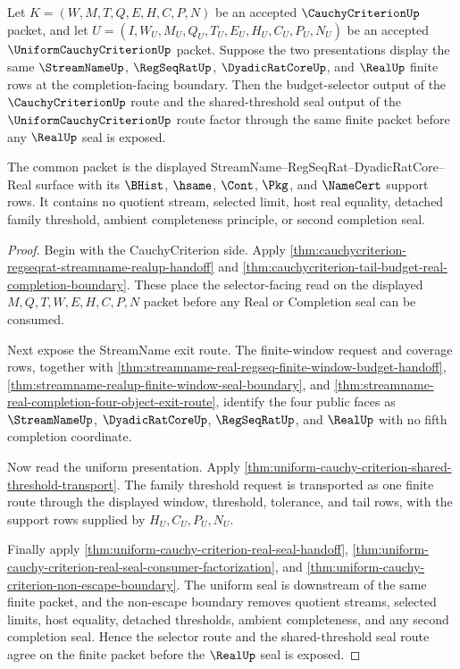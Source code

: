 \begin{theorem}
\label{thm:cauchycriterion-uniform-selector-seal-compatibility}
Let $K=(W,M,T,Q,E,H,C,P,N)$ be an accepted $\CauchyCriterionUp$ packet, and
let $U=(I,W_U,M_U,Q_U,T_U,E_U,H_U,C_U,P_U,N_U)$ be an accepted
$\UniformCauchyCriterionUp$ packet. Suppose the two presentations display the
same $\StreamNameUp$, $\RegSeqRatUp$, $\DyadicRatCoreUp$, and $\RealUp$ finite
rows at the completion-facing boundary. Then the budget-selector output of the
$\CauchyCriterionUp$ route and the shared-threshold seal output of the
$\UniformCauchyCriterionUp$ route factor through the same finite packet before
any $\RealUp$ seal is exposed.

The common packet is the displayed StreamName--RegSeqRat--DyadicRatCore--Real
surface with its $\BHist$, $\hsame$, $\Cont$, $\Pkg$, and $\NameCert$ support
rows. It contains no quotient stream, selected limit, host real equality,
detached family threshold, ambient completeness principle, or second
completion seal.
\end{theorem}
\begin{proof}
Begin with the CauchyCriterion side. Apply
\autoref{thm:cauchycriterion-regseqrat-streamname-realup-handoff} and
\autoref{thm:cauchycriterion-tail-budget-real-completion-boundary}. These
place the selector-facing read on the displayed $M,Q,T,W,E,H,C,P,N$ packet
before any Real or Completion seal can be consumed.

Next expose the StreamName exit route. The finite-window request and coverage
rows, together with
\autoref{thm:streamname-real-regseq-finite-window-budget-handoff},
\autoref{thm:streamname-realup-finite-window-seal-boundary}, and
\autoref{thm:streamname-real-completion-four-object-exit-route}, identify the
four public faces as $\StreamNameUp$, $\DyadicRatCoreUp$, $\RegSeqRatUp$, and
$\RealUp$ with no fifth completion coordinate.

Now read the uniform presentation. Apply
\autoref{thm:uniform-cauchy-criterion-shared-threshold-transport}. The family
threshold request is transported as one finite route through the displayed
window, threshold, tolerance, and tail rows, with the support rows supplied by
$H_U,C_U,P_U,N_U$.

Finally apply
\autoref{thm:uniform-cauchy-criterion-real-seal-handoff},
\autoref{thm:uniform-cauchy-criterion-real-seal-consumer-factorization}, and
\autoref{thm:uniform-cauchy-criterion-non-escape-boundary}. The uniform seal
is downstream of the same finite packet, and the non-escape boundary removes
quotient streams, selected limits, host equality, detached thresholds, ambient
completeness, and any second completion seal. Hence the selector route and the
shared-threshold seal route agree on the finite packet before the $\RealUp$
seal is exposed.
\end{proof}

